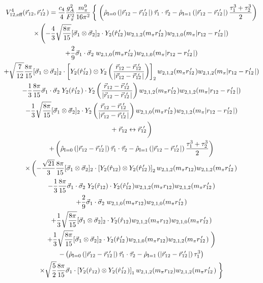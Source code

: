 \documentclass[%
 preprint,
 amsmath,amssymb,
 aps,
]{revtex4-1}
\newcommand{\rhohat}[2]{\hat{\rho}_{\text{I}=#1}\left( #2 \right)}
\newcommand{\rot}{\vec{r}_{12}}
\newcommand{\rotp}{\vec{r}_{12}\!\!\!'\,\,}
\newcommand{\rotpr}{r_{12}\!\!\!\!'\,\,\,}
\newcommand{\rotphat}{\hat{r}_{12}\!\!\!\!'\,\,\,}
\newcommand{\taudot}{\vec{\tau}_1\cdot\vec{\tau}_2}
\newcommand{\tauplusthree}{\frac{\tau_1^3+\tau_2^3}{2}}
\newcommand{\sigmadot}{\vec{\sigma}_1\cdot\vec{\sigma}_2}
\newcommand{\sigmatwo}{[\vec{\sigma}_1\otimes\vec{\sigma}_2]_2}
\newcommand{\fracphantom}{\vphantom{\frac{1}{1}}}
\newcommand{\w}[4]{w_{#1,#2,#3}(#4)}
\begin{document}
\begin{multline}
V^{4}_{12,\text{eff}}(\rot,\rotp) = \frac{c_4}{4}\frac{g_A^2}{F_\pi^2}\frac{m_\pi^9}{16\pi^2}\left\{ \fracphantom \right. 
\left(\rhohat{0}{|\rot-\rotp|}\taudot-\rhohat{1}{|\rot-\rotp|}\tauplusthree\right)
\\
\times\left( -\frac{4}{3}\sqrt{\frac{8\pi}{15}}\sigmatwo\cdot Y_2(\rotphat)\w{2}{1}{2}{m_\pi \rotpr}\w{2}{1}{0}{m_\pi |r_{12}- \rotpr|} \right. \\
+\frac{2}{9}\sigmadot\; \w{2}{1}{0}{m_\pi \rotpr}\w{2}{1}{0}{m_\pi |r_{12}- \rotpr|} \\
+\sqrt{\frac{7}{12}}\frac{8\pi}{15}\sigmatwo\cdot \left[ Y_2(\rotphat)\otimes Y_2 \left(\frac{\rot-\rotp}{|\rot-\rotp|}\right) \right]_2 \w{2}{1}{2}{m_\pi \rotpr}\w{2}{1}{2}{m_\pi |r_{12}- \rotpr|} \\
-\frac{1}{3}\frac{8\pi}{15}\sigmadot \; Y_2(\rotphat)\cdot Y_2\left(\frac{\rot-\rotp}{|\rot-\rotp|}\right) \w{2}{1}{2}{m_\pi \rotpr}\w{2}{1}{2}{m_\pi |r_{12}- \rotpr|} \\
-\frac{1}{3}\sqrt{\frac{8\pi}{15}}\sigmatwo\cdot Y_2\left(\frac{\rot-\rotp}{|\rot-\rotp|}\right)\w{2}{1}{0}{m_\pi \rotpr}\w{2}{1}{2}{m_\pi |r_{12}- \rotpr|} \\
\left.+\; \rot \leftrightarrow \rotp \fracphantom\right) \\
+\left(\rhohat{0}{|\rot-\rotp|}\taudot-\rhohat{1}{|\rot-\rotp|}\tauplusthree\right) \\
\times \left( 
-\frac{\sqrt{21}}{3}\frac{8\pi}{15}\sigmatwo \cdot \left[Y_2(\hat{r}_{12})\otimes Y_2(\rotphat)\right]_2 \w{2}{1}{2}{m_\pi r_{12}} \w{2}{1}{2}{m_\pi \rotpr} \right. \\
-\frac{1}{3}\frac{8\pi}{15}\sigmadot\; Y_2(\hat{r}_{12}) \cdot Y_2(\rotphat)\w{2}{1}{2}{m_\pi r_{12}} \w{2}{1}{2}{m_\pi \rotpr} \\
+\frac{2}{9}\sigmadot \;\w{2}{1}{0}{m_\pi r_{12}} \w{2}{1}{0}{m_\pi \rotpr} \\
+\frac{1}{3}\sqrt{\frac{8\pi}{15}} \sigmatwo \cdot Y_2(\hat{r}_{12}) \w{2}{1}{2}{m_\pi r_{12}} \w{2}{1}{0}{m_\pi \rotpr} \\
+\frac{1}{3}\sqrt{\frac{8\pi}{15}} \sigmatwo \cdot Y_2(\rotphat) \w{2}{1}{0}{m_\pi r_{12}} \w{2}{1}{2}{m_\pi \rotpr} \left.\fracphantom\right) \\
%
-\left(\rhohat{0}{|\rot-\rotp|}\taudot-\rhohat{1}{|\rot-\rotp|}\tau_1^3 \right) \\
\times\sqrt{\frac{5}{2}} \frac{8\pi}{15} \vec{\sigma}_1\cdot\left[Y_2(\hat{r}_{12})\otimes Y_2(\rotphat)\right]_1 \w{2}{1}{2}{m_\pi r_{12}} \w{2}{1}{2}{m_\pi \rotpr} \left.\fracphantom\right\}
\end{multline}
\end{document}

